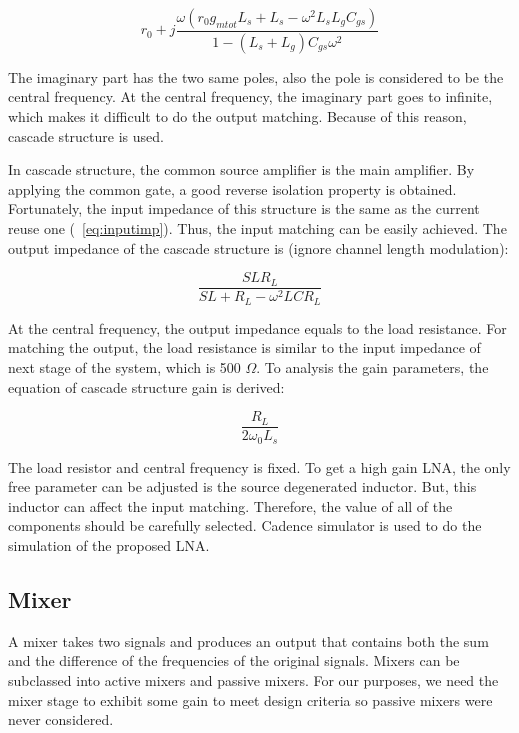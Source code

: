 \begin{equation} 
  	r_0 + j\frac{\omega(r_0g_{mtot}L_s+L_s-\omega^2L_sL_gC_{gs})}{1-(L_s+L_g)C_{gs}\omega^2}
\end{equation}

The imaginary part has the two same poles, also the pole is considered to be the central frequency. At the central frequency, the imaginary part goes to infinite, which makes it difficult to do the output matching. Because of this reason, cascade structure is used.

In cascade structure, the common source amplifier is the main amplifier. By applying the common gate, a good reverse isolation property is obtained. Fortunately, the input impedance of this structure is the same as the current reuse one (~\ref{eq:inputimp}). Thus, the input matching can be easily achieved. The output impedance of the cascade structure is (ignore channel length modulation):

\begin{equation} 
  	\frac{SLR_L}{SL+R_L-\omega^2LCR_L}
\end{equation}

At the central frequency, the output impedance equals to the load resistance. For matching the output, the load resistance is similar to the input impedance of next stage of the system, which is 500 $\Omega$. To analysis the gain parameters, the equation of cascade structure gain is derived: 

\begin{equation} 
  	\frac{R_L}{2\omega_0L_s}
\end{equation}

The load resistor and central frequency is fixed. To get a high gain LNA, the only free parameter can be adjusted is the source degenerated inductor. But, this inductor can affect the input matching. Therefore, the value of all of the components should be carefully selected. Cadence simulator is used to do the simulation of the proposed LNA. 

\subsection{Mixer}

A mixer takes two signals and produces an output that contains both the sum and the difference of the frequencies of the original signals. Mixers can be subclassed into active mixers and passive mixers. For our purposes, we need the mixer stage to exhibit some gain to meet design criteria so passive mixers were never considered. 

